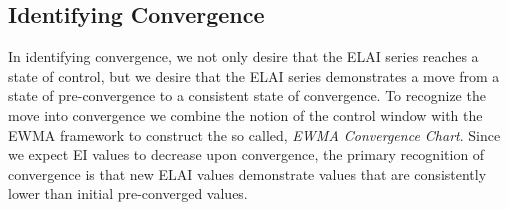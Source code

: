 \documentclass[12pt]{article}
\begin{document}
%
%

%
%
\subsection{Identifying Convergence}
%
%

%
In identifying convergence, we not only desire that the ELAI series reaches a state of control, but we desire that the ELAI series demonstrates a move from a state of pre-convergence to a consistent state of convergence.
%
To recognize the move into convergence we combine the notion of the control window with the EWMA framework to construct the so called, {\it EWMA Convergence Chart}.
%
Since we expect EI values to decrease upon convergence, the primary recognition of convergence is that new ELAI values demonstrate values that are consistently lower than initial pre-converged values.
%

%
%
\end{document}
